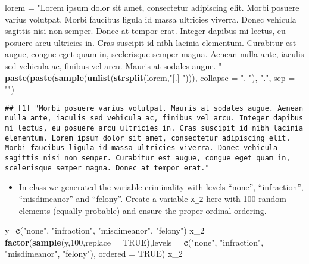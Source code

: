 \documentclass[]{article}
\newenvironment{Shaded}{\begin{snugshade}}{\end{snugshade}}
\newcommand{\KeywordTok}[1]{\textcolor[rgb]{0.13,0.29,0.53}{\textbf{#1}}}
\newcommand{\DataTypeTok}[1]{\textcolor[rgb]{0.13,0.29,0.53}{#1}}
\newcommand{\DecValTok}[1]{\textcolor[rgb]{0.00,0.00,0.81}{#1}}
\newcommand{\StringTok}[1]{\textcolor[rgb]{0.31,0.60,0.02}{#1}}
\newcommand{\OtherTok}[1]{\textcolor[rgb]{0.56,0.35,0.01}{#1}}
\newcommand{\NormalTok}[1]{#1}
\providecommand{\tightlist}{%
  \setlength{\itemsep}{0pt}\setlength{\parskip}{0pt}}
\begin{document}
\begin{Shaded}
\begin{Highlighting}[]
\NormalTok{lorem =}\StringTok{ "Lorem ipsum dolor sit amet, consectetur adipiscing elit. Morbi posuere varius volutpat. Morbi faucibus ligula id massa ultricies viverra. Donec vehicula sagittis nisi non semper. Donec at tempor erat. Integer dapibus mi lectus, eu posuere arcu ultricies in. Cras suscipit id nibh lacinia elementum. Curabitur est augue, congue eget quam in, scelerisque semper magna. Aenean nulla ante, iaculis sed vehicula ac, finibus vel arcu. Mauris at sodales augue. "}
\KeywordTok{paste}\NormalTok{(}\KeywordTok{paste}\NormalTok{(}\KeywordTok{sample}\NormalTok{(}\KeywordTok{unlist}\NormalTok{(}\KeywordTok{strsplit}\NormalTok{(lorem,}\StringTok{"[.] "}\NormalTok{))), }\DataTypeTok{collapse =} \StringTok{". "}\NormalTok{), }\StringTok{"."}\NormalTok{, }\DataTypeTok{sep =} \StringTok{""}\NormalTok{)}
\end{Highlighting}
\end{Shaded}

\begin{verbatim}
## [1] "Morbi posuere varius volutpat. Mauris at sodales augue. Aenean nulla ante, iaculis sed vehicula ac, finibus vel arcu. Integer dapibus mi lectus, eu posuere arcu ultricies in. Cras suscipit id nibh lacinia elementum. Lorem ipsum dolor sit amet, consectetur adipiscing elit. Morbi faucibus ligula id massa ultricies viverra. Donec vehicula sagittis nisi non semper. Curabitur est augue, congue eget quam in, scelerisque semper magna. Donec at tempor erat."
\end{verbatim}

\begin{itemize}
\tightlist
\item
  In class we generated the variable criminality with levels ``none'',
  ``infraction'', ``misdimeanor'' and ``felony''. Create a variable
  \texttt{x\_2} here with 100 random elements (equally probable) and
  ensure the proper ordinal ordering.
\end{itemize}

\begin{Shaded}
\begin{Highlighting}[]
\NormalTok{y=}\KeywordTok{c}\NormalTok{(}\StringTok{"none"}\NormalTok{, }\StringTok{"infraction"}\NormalTok{, }\StringTok{"misdimeanor"}\NormalTok{, }\StringTok{"felony"}\NormalTok{)}
\NormalTok{x_}\DecValTok{2}\NormalTok{ =}\StringTok{ }\KeywordTok{factor}\NormalTok{(}\KeywordTok{sample}\NormalTok{(y,}\DecValTok{100}\NormalTok{,}\DataTypeTok{replace =} \OtherTok{TRUE}\NormalTok{),}\DataTypeTok{levels =} \KeywordTok{c}\NormalTok{(}\StringTok{"none"}\NormalTok{, }\StringTok{"infraction"}\NormalTok{, }\StringTok{"misdimeanor"}\NormalTok{, }\StringTok{"felony"}\NormalTok{), }\DataTypeTok{ordered =} \OtherTok{TRUE}\NormalTok{)}
\NormalTok{x_}\DecValTok{2}
\end{Highlighting}
\end{Shaded}
\end{document}
